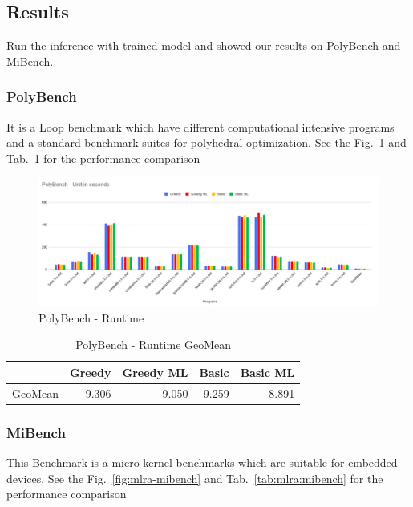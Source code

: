 \subsection{Results}

Run the inference with trained model and showed our results on PolyBench and MiBench\cite{mibench}.
\subsubsection{PolyBench}
It is a Loop benchmark which have different computational intensive programs and a standard benchmark suites for polyhedral optimization. See the Fig.~\ref{fig:mlra-polybench} and Tab.~\ref{tab:mlra:polybench} for the performance comparison

\begin{figure}[t]
    \centering
    \includegraphics[scale=0.4]{figures/chapter-5/polybench.png}
    \caption{PolyBench - Runtime}
     \label{fig:mlra-polybench}
\end{figure}


\begin{table}[h]
\begin{tabular}{|l|l|l|l|l|}
\hline
 & \textbf{Greedy} & \textbf{Greedy ML} & \textbf{Basic} & \textbf{Basic ML} \\ \hline
GeoMean & \multicolumn{1}{r|}{9.306} & \multicolumn{1}{r|}{9.050} & \multicolumn{1}{r|}{9.259} & \multicolumn{1}{r|}{8.891} \\ \hline
\end{tabular}
\centering
\caption{PolyBench - Runtime GeoMean}
\label{tab:mlra:polybench}
\end{table}

\subsubsection{MiBench}
This Benchmark is a micro-kernel benchmarks which are suitable for embedded devices.  See the Fig.~\ref{fig:mlra-mibench} and Tab.~\ref{tab:mlra:mibench} for the performance comparison

